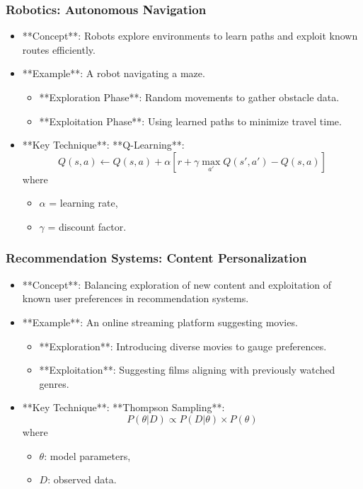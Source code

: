 \documentclass[aspectratio=169]{beamer}
\begin{document}
\begin{frame}[fragile]
    \frametitle{Robotics: Autonomous Navigation}
    \begin{itemize}
        \item **Concept**: Robots explore environments to learn paths and exploit known routes efficiently.
        \item **Example**: A robot navigating a maze.
        \begin{itemize}
            \item **Exploration Phase**: Random movements to gather obstacle data.
            \item **Exploitation Phase**: Using learned paths to minimize travel time.
        \end{itemize}
        \item **Key Technique**: **Q-Learning**:
        \begin{equation}
        Q(s, a) \leftarrow Q(s, a) + \alpha [r + \gamma \max_{a'} Q(s', a') - Q(s, a)]
        \end{equation}
        where 
        \begin{itemize}
            \item \( \alpha \) = learning rate,
            \item \( \gamma \) = discount factor.
        \end{itemize}
    \end{itemize}
\end{frame}

\begin{frame}[fragile]
    \frametitle{Recommendation Systems: Content Personalization}
    \begin{itemize}
        \item **Concept**: Balancing exploration of new content and exploitation of known user preferences in recommendation systems.
        \item **Example**: An online streaming platform suggesting movies.
        \begin{itemize}
            \item **Exploration**: Introducing diverse movies to gauge preferences.
            \item **Exploitation**: Suggesting films aligning with previously watched genres.
        \end{itemize}
        \item **Key Technique**: **Thompson Sampling**:
        \begin{equation}
        P(\theta | D) \propto P(D | \theta) \times P(\theta)
        \end{equation}
        where 
        \begin{itemize}
            \item \( \theta \): model parameters,
            \item \( D \): observed data.
        \end{itemize}
    \end{itemize}
\end{frame}
\end{document}
